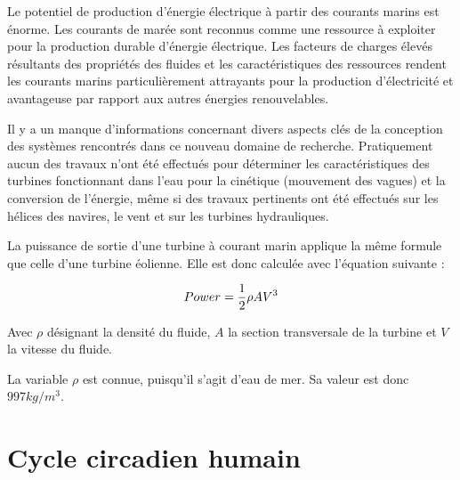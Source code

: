 Le potentiel de production d'énergie électrique à partir des courants marins est énorme.
Les courants de marée sont reconnus comme une ressource à exploiter pour la production durable d'énergie électrique.
Les facteurs de charges élevés résultants des propriétés des fluides et les caractéristiques des ressources rendent
les courants marins particulièrement attrayants pour la production d'électricité et avantageuse
par rapport aux autres énergies renouvelables.

Il y a un manque d'informations concernant divers aspects clés de la conception des systèmes rencontrés
dans ce nouveau domaine de recherche.
Pratiquement aucun des travaux n'ont été effectués pour déterminer les caractéristiques des turbines
fonctionnant dans l'eau pour la cinétique (mouvement des vagues) et la conversion de l'énergie,
même si des travaux pertinents ont été effectués sur les hélices des navires, le vent et sur les turbines hydrauliques.

La puissance de sortie d'une turbine à courant marin applique la même formule que celle d'une turbine éolienne.
Elle est donc calculée avec l'équation suivante :

\begin{equation}
  Power = {1 \over 2} \rho A V^3
\end{equation}

Avec $\rho$ désignant la densité du fluide, $A$ la section transversale de la turbine et $V$ la vitesse du fluide.

La variable $\rho$ est connue, puisqu'il s'agit d'eau de mer. Sa valeur est donc $997 kg/m^3$.

\section{Cycle circadien humain}



